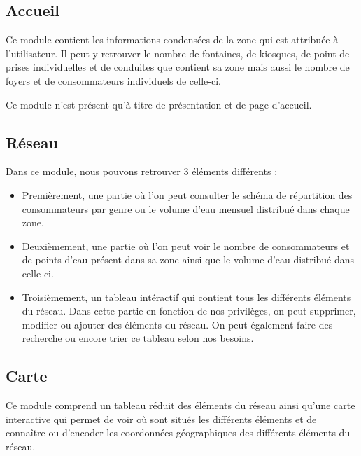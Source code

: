 \documentclass{EPL-master-thesis-covers-FR}
\begin{document}
			\subsection{Accueil}
				Ce module contient les informations condensées de la zone qui est attribuée à l'utilisateur. Il peut y retrouver le nombre de fontaines, de kiosques, de point de prises individuelles et de conduites que contient sa zone mais aussi le nombre de foyers et de consommateurs individuels de celle-ci. 
				
				Ce module n'est présent qu'à titre de présentation et de page d'accueil.
				
				
			\subsection{Réseau}
				Dans ce module, nous pouvons retrouver 3 éléments différents :
				\begin{itemize}
					\item Premièrement, une partie où l'on peut consulter le schéma de répartition des consommateurs par genre ou le volume d'eau mensuel distribué dans chaque zone.
					\item Deuxièmement, une partie où l'on peut voir le nombre de consommateurs et de points d'eau présent dans sa zone ainsi que le volume d'eau distribué dans celle-ci.
					\item Troisièmement, un tableau intéractif qui contient tous les différents éléments du réseau. Dans cette partie en fonction de nos privilèges, on peut supprimer, modifier ou ajouter des éléments du réseau. On peut également faire des recherche ou encore trier ce tableau selon nos besoins.
				\end{itemize}
				
			\subsection{Carte}
				Ce module comprend un tableau réduit des éléments du réseau ainsi qu'une carte interactive qui permet de voir où sont situés les différents éléments et de connaître ou d'encoder les coordonnées géographiques des différents éléments du réseau.
				
\end{document}
